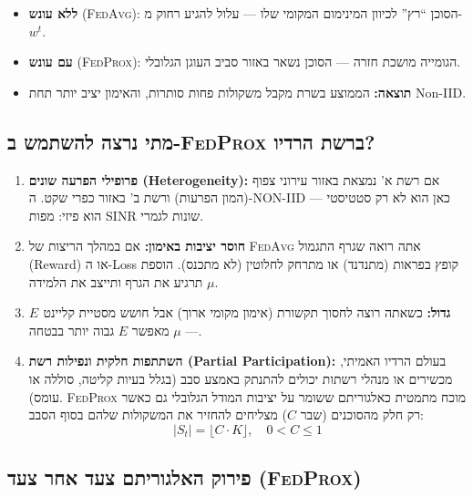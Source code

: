 \documentclass[11pt,a4paper]{article}
\newcommand{\FedAvg}{\textsc{FedAvg}}
\newcommand{\FedProx}{\textsc{FedProx}}
\begin{document}
\begin{itemize}
  \item \textbf{ללא עונש} (\FedAvg): הסוכן ``רץ'' לכיוון המינימום המקומי שלו --- עלול להגיע רחוק מ-$w^t$.
  \item \textbf{עם עונש} (\FedProx): הגומייה מושכת חזרה --- הסוכן נשאר באזור סביב העוגן הגלובלי.
  \item \textbf{תוצאה:} הממוצע בשרת מקבל משקולות פחות סותרות, והאימון יציב יותר תחת Non-IID.
\end{itemize}

\subsection{מתי נרצה להשתמש ב-\FedProx{} ברשת הרדיו?}
\label{subsec:fedprox-when}

\begin{enumerate}[label=\textbf{\arabic*.}]
  \item \textbf{פרופילי הפרעה שונים (Heterogeneity):}
    אם רשת א' נמצאת באזור עירוני צפוף (המון הפרעות) ורשת ב' באזור כפרי שקט.
    ה-NON-IID כאן הוא לא רק סטטיסטי --- הוא פיזי: מפות SINR שונות לגמרי.

  \item \textbf{חוסר יציבות באימון:}
    אם במהלך הריצות של \FedAvg{} אתה רואה שגרף התגמול (Reward) או ה-Loss קופץ בפראות (מתנדנד) או מתרחק לחלוטין (לא מתכנס).
    הוספת $\mu$ תרגיע את הגרף ותייצב את הלמידה.

  \item \textbf{$E$ גדול:}
    כשאתה רוצה לחסוך תקשורת (אימון מקומי ארוך) אבל חושש מסטיית קליינט --- $\mu$ מאפשר $E$ גבוה יותר בבטחה.

  \item \textbf{השתתפות חלקית ונפילות רשת (Partial Participation):}
    בעולם הרדיו האמיתי, מכשירים או מנהלי רשתות יכולים להתנתק באמצע סבב (בגלל בעיות קליטה, סוללה או עומס).
    \FedProx{} מוכח מתמטית כאלגוריתם ששומר על יציבות המודל הגלובלי גם כאשר רק חלק מהסוכנים (שבר $C$) מצליחים להחזיר את המשקולות שלהם בסוף הסבב:
    \[
      |S_t| = \lfloor C \cdot K \rfloor, \quad 0 < C \leq 1
    \]
\end{enumerate}

\subsection{פירוק האלגוריתם צעד אחר צעד (\FedProx{})}
\label{subsec:fedprox-algorithm-steps}
\end{document}
